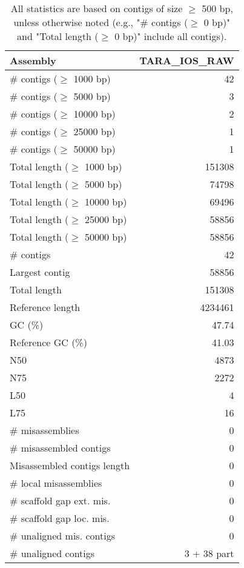 \documentclass[12pt,a4paper]{article}
\begin{document}
\begin{table}[ht]
\begin{center}
\caption{All statistics are based on contigs of size $\geq$ 500 bp, unless otherwise noted (e.g., "\# contigs ($\geq$ 0 bp)" and "Total length ($\geq$ 0 bp)" include all contigs).}
\begin{tabular}{|l*{1}{|r}|}
\hline
Assembly & TARA\_IOS\_RAW \\ \hline
\# contigs ($\geq$ 1000 bp) & 42 \\ \hline
\# contigs ($\geq$ 5000 bp) & 3 \\ \hline
\# contigs ($\geq$ 10000 bp) & 2 \\ \hline
\# contigs ($\geq$ 25000 bp) & 1 \\ \hline
\# contigs ($\geq$ 50000 bp) & 1 \\ \hline
Total length ($\geq$ 1000 bp) & 151308 \\ \hline
Total length ($\geq$ 5000 bp) & 74798 \\ \hline
Total length ($\geq$ 10000 bp) & 69496 \\ \hline
Total length ($\geq$ 25000 bp) & 58856 \\ \hline
Total length ($\geq$ 50000 bp) & 58856 \\ \hline
\# contigs & 42 \\ \hline
Largest contig & 58856 \\ \hline
Total length & 151308 \\ \hline
Reference length & 4234461 \\ \hline
GC (\%) & 47.74 \\ \hline
Reference GC (\%) & 41.03 \\ \hline
N50 & 4873 \\ \hline
N75 & 2272 \\ \hline
L50 & 4 \\ \hline
L75 & 16 \\ \hline
\# misassemblies & 0 \\ \hline
\# misassembled contigs & 0 \\ \hline
Misassembled contigs length & 0 \\ \hline
\# local misassemblies & 0 \\ \hline
\# scaffold gap ext. mis. & 0 \\ \hline
\# scaffold gap loc. mis. & 0 \\ \hline
\# unaligned mis. contigs & 0 \\ \hline
\# unaligned contigs & 3 + 38 part \\ \hline

\end{tabular}
\end{center}
\end{table}
\end{document}

